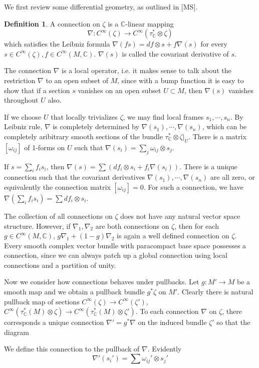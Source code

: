 \documentclass[12pt]{article}
\theoremstyle{plain}
\theoremstyle{definition}
\newtheorem{definition}[equation]{Definition}
\newcommand{\IC}{\mathbb{C}}
\newcommand\tensor{{\otimes}}
\newcommand{\<}{\langle}
\renewcommand{\>}{\rangle}
\newcommand{\w}{\omega}
\begin{document}
We first review some differential geometry, as outlined in [MS]. 
\begin{definition}
A connection on $\zeta$ is a $\IC$-linear mapping 
$$ \nabla : C^\infty(\zeta) \to C^\infty (\tau^*_\IC \tensor \zeta) $$
which satisfies the Leibniz formula $\nabla (fs) = df \tensor s + f \nabla (s)$ for every $s \in C^\infty(\zeta), f \in C^\infty(M, \IC)$. $\nabla(s)$ is called the covariant derivative of $s$. 
\end{definition}

The connection $\nabla$ is a local operator, i.e. it makes sense to talk about the restriction $\nabla$ to an open subset of $M$, since with a bump function it is easy to show that if a section $s$ vanishes on an open subset $U \subset M$, then $\nabla (s)$ vanishes throughout $U$ also. 

If we choose $U$ that locally trivializes $\zeta$, we may find local frames $s_1, \cdots, s_n$. By Leibniz rule, $\nabla$ is completely determined by $\nabla(s_1), \cdots, \nabla(s_n)$, which can be completely aribitrary smooth sections of the bundle $\tau_\IC^* \tensor \zeta |_U$. There is a matrix $[\w_{ij}]$ of 1-forms on $U$ such that $\nabla (s_i) = \sum_j \w_{ij} \tensor s_j$.

If $s = \sum_i f_i s_i$, then $\nabla (s) = \sum (df_i \tensor s_i + f_i \nabla (s_i))$. There is a unique connection such that the covariant derivatives $\nabla(s_1), \cdots, \nabla(s_n)$ are all zero, or equivalently the connection matrix $[\w_{ij}] = 0$. For such a connection, we have $\nabla(\sum_i f_i s_i) = \sum df_i \tensor s_i$. 

The collection of all connections on $\zeta$ does not have any natural vector space structure. However, if $\nabla_1, \nabla_2$ are both connections on $\zeta$, then for each $g \in C^\infty(M, \IC)$, $g \nabla_1 + (1 - g) \nabla_2$ is again a well defined connection on $\zeta$. Every smooth complex vector bundle with paracompact base space possesses a connection, since we can always patch up a global connection using local connections and a partition of unity. 

Now we consider how connections behaves under pullbacks. Let $g : M' \to M$ be a smooth map and we obtain a pullback bundle $g^* \zeta$ on $M'$. Clearly there is natural pullback map of sections $C^\infty(\zeta) \to C^\infty(\zeta')$, $C^\infty(\tau_\IC^* (M) \tensor \zeta) \to C^\infty(\tau_\IC^* (M) \tensor \zeta')$. To each connection $\nabla$ on $\zeta$, there corresponds a unique connection $\nabla' = g^* \nabla$ on the induced bundle $\zeta'$ so that the diagram 
\begin{center}
\end{center}
We define this connection to the pullback of $\nabla$. Evidently 
$$ \nabla' (s_i ') = \sum \w_{ij}' \tensor s_j' $$ 
\end{document}

